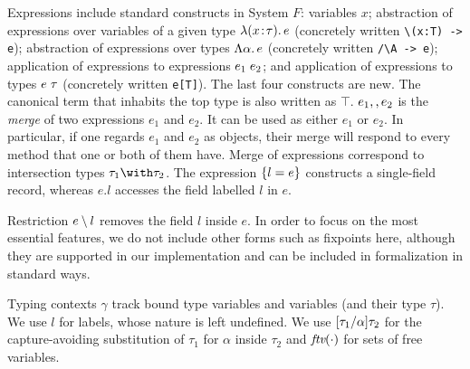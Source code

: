 Expressions include standard constructs in System
$F$: variables $ x $; abstraction of expressions over variables of a given type
$\lambda (x \!:\! \tau).\, e$ (concretely written \lstinline$\(x:T) -> e$); 
abstraction of expressions over types $\Lambda \alpha.\, e$ (concretely written \lstinline$/\A -> e$); 
application of expressions to expressions $e_1 \; e_2$; 
and application of expressions to types $e \; \tau$ (concretely written \lstinline$e[T]$). 
The last four constructs are new.
The canonical term that inhabits the top type is also written as $\top$.
$e_1 ,, e_2$ is the \emph{merge} of two expressions $e_1$ and $e_2$.
It can be used as either $ e_1 $ or $ e_2 $. In particular, if one regards $e_1$
and $e_2$ as objects, their merge will respond to every method that one or
both of them have. Merge of expressions correspond to intersection types
$ \tau_1 \andop \tau_2 $. The expression $ \{ l = e \} $ constructs a
single-field record, whereas $ e.l $ accesses the field labelled $ l $ in $ e $. 
\begin{comment}
Note that $ e $ does not
need to be a record type in this case. For example, although the merge of two
records
\[
x = \reccon {l_1} {e_1} \mergeop \reccon {l_1} {e_2} 
\]
is of an intersection type, $ x.{l_1} $ still gives $ e_1 $. On the other hand,
$ x.{l_3} $ will be rejected by the type system. 
\end{comment}
Restriction $e \setminus l$ removes the field $l$ inside $e$. In order to
focus on the most essential features, we do not include other forms such as
fixpoints here, although they are supported in our implementation and can
be included in formalization in standard ways.

Typing contexts $ \gamma $ track bound type variables and variables (and their
type $\tau$). We use $l$ for labels, whose nature is left undefined. We use
$\lbrack \tau_1 / \alpha \rbrack {\tau_2}$ for the capture-avoiding substitution of
$\tau_1$ for $\alpha$ inside $\tau_2$ and $\textit{ftv}({\cdot})$ for sets of free
variables.

\begin{comment}
\paragraph{Discussion.} A natural question the reader might ask is that why we
have excluded union types from the language. The answer is we found that
intersection types alone are enough support extensible designs. To focus on the
key features that make this language interesting, we also omit other common
constructs. For example, fixpoints can be added in standard ways.
\end{comment}

